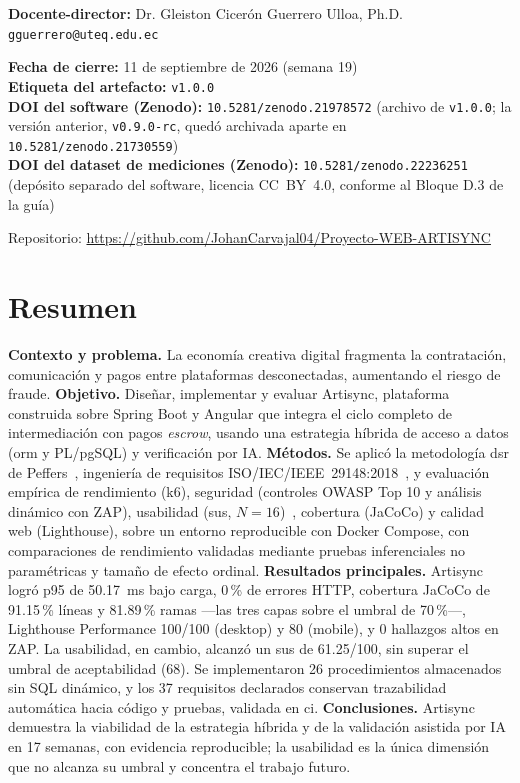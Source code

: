 \begin{titlepage}
\textbf{Docente-director:} Dr. Gleiston Cicerón Guerrero Ulloa, Ph.D.\\
\texttt{gguerrero@uteq.edu.ec}\\[1cm]

\begin{minipage}{0.85\textwidth}
\centering
\textbf{Fecha de cierre:} 11 de septiembre de 2026 (semana 19)\\
\textbf{Etiqueta del artefacto:} \texttt{v1.0.0}\\
\textbf{DOI del software (Zenodo):} \texttt{10.5281/zenodo.21978572}
(archivo de \texttt{v1.0.0}; la versión anterior, \texttt{v0.9.0-rc},
quedó archivada aparte en \texttt{10.5281/zenodo.21730559})\\
\textbf{DOI del dataset de mediciones (Zenodo):}
\texttt{10.5281/zenodo.22236251} (depósito separado del software,
licencia CC~BY~4.0, conforme al Bloque D.3 de la guía)
\end{minipage}

\vfill
{\small Repositorio: \url{https://github.com/JohanCarvajal04/Proyecto-WEB-ARTISYNC}}
\end{titlepage}

\chapter*{Resumen}

\textbf{Contexto y problema.} La economía creativa digital fragmenta la contratación, comunicación y pagos entre plataformas desconectadas, aumentando el riesgo de fraude. \textbf{Objetivo.} Diseñar, implementar y evaluar Artisync, plataforma construida sobre Spring Boot y Angular que integra el ciclo completo de intermediación con pagos \emph{escrow}, usando una estrategia híbrida de acceso a datos (\gls{orm} y PL/pgSQL) y verificación por IA. \textbf{Métodos.} Se aplicó la metodología \gls{dsr} de Peffers~\cite{PEFFERS2007}, ingeniería de requisitos ISO/IEC/IEEE~29148:2018~\cite{ISO29148}, y evaluación empírica de rendimiento (k6), seguridad (controles OWASP Top 10 y análisis dinámico con ZAP), usabilidad (\gls{sus}, $N=16$)~\cite{BROOKE1996,BANGOR2009}, cobertura (JaCoCo) y calidad web (Lighthouse), sobre un entorno reproducible con Docker Compose, con comparaciones de rendimiento validadas mediante pruebas inferenciales no paramétricas y tamaño de efecto ordinal. \textbf{Resultados principales.} Artisync logró p95 de 50.17~ms bajo carga, 0\,\% de errores HTTP, cobertura JaCoCo de 91.15\,\% líneas y 81.89\,\% ramas ---las tres capas sobre el umbral de 70\,\%---, Lighthouse Performance 100/100 (desktop) y 80 (mobile), y 0 hallazgos altos en ZAP. La usabilidad, en cambio, alcanzó un \gls{sus} de 61.25/100, sin superar el umbral de aceptabilidad (68). Se implementaron 26 procedimientos almacenados sin SQL dinámico, y los 37 requisitos declarados conservan trazabilidad automática hacia código y pruebas, validada en \gls{ci}. \textbf{Conclusiones.} Artisync demuestra la viabilidad de la estrategia híbrida y de la validación asistida por IA en 17 semanas, con evidencia reproducible; la usabilidad es la única dimensión que no alcanza su umbral y concentra el trabajo futuro.

